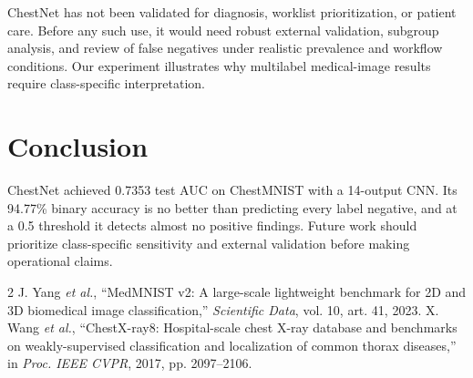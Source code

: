 \documentclass[conference]{IEEEtran}
\begin{document}
ChestNet has not been validated for diagnosis, worklist prioritization, or patient care. Before any such use, it would need robust external validation, subgroup analysis, and review of false negatives under realistic prevalence and workflow conditions. Our experiment illustrates why multilabel medical-image results require class-specific interpretation.

\section{Conclusion}
ChestNet achieved 0.7353 test AUC on ChestMNIST with a 14-output CNN. Its 94.77\% binary accuracy is no better than predicting every label negative, and at a 0.5 threshold it detects almost no positive findings. Future work should prioritize class-specific sensitivity and external validation before making operational claims.

\begin{thebibliography}{2}
 J. Yang \emph{et al.}, ``MedMNIST v2: A large-scale lightweight benchmark for 2D and 3D biomedical image classification,'' \emph{Scientific Data}, vol. 10, art. 41, 2023.
 X. Wang \emph{et al.}, ``ChestX-ray8: Hospital-scale chest X-ray database and benchmarks on weakly-supervised classification and localization of common thorax diseases,'' in \emph{Proc. IEEE CVPR}, 2017, pp. 2097--2106.
\end{thebibliography}
\end{document}
